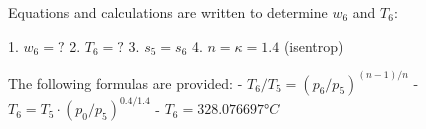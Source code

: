 Equations and calculations are written to determine \( w_6 \) and \( T_6 \):  

1. \( w_6 = ? \)  
2. \( T_6 = ? \)  
3. \( s_5 = s_6 \)  
4. \( n = \kappa = 1.4 \) (isentrop)  

The following formulas are provided:  
- \( T_6 / T_5 = (p_6 / p_5)^{(n-1)/n} \)  
- \( T_6 = T_5 \cdot (p_0 / p_5)^{0.4/1.4} \)  
- \( T_6 = 328.076697 °C \)